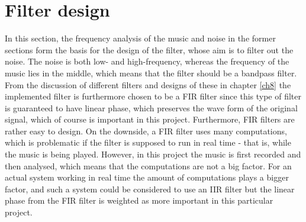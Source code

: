 \section{Filter design}\label{sec:filtervalg}
In this section, the frequency analysis of the music and noise in the former sections form the basis for the design of the filter, whose aim is to filter out the noise. The noise is both low- and high-frequency, whereas the frequency of the music lies in the middle, which means that the filter should be a bandpass filter. From the discussion of different filters and designs of these in chapter \ref{ch8} the implemented filter is furthermore chosen to be a FIR filter since this type of filter is guaranteed to have linear phase, which preserves the wave form of the original signal, which of course is important in this project. Furthermore, FIR filters are rather easy to design. On the downside, a FIR filter uses many computations, which is problematic if the filter is supposed to run in real time - that is, while the music is being played. However, in this project the music is first recorded and then analysed, which means that the computations are not a big factor. For an actual system working in real time the amount of computations plays a bigger factor, and such a system could be considered to use an IIR filter but the linear phase from the FIR filter is weighted as more important in this particular project.